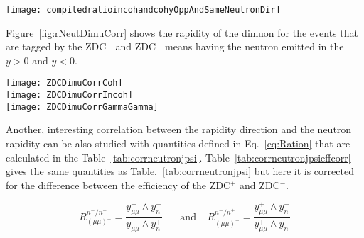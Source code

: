     \begin{figure*}[!Hhtb]
      \begin{center}
        \texttt{[image: compiledratioincohandcohyOppAndSameNeutronDir]}
        \caption{ \label{fig:r4} Rapidity ratios $R_{opp/same}$ for low-\pt 
          ( left) and high-\pt ( right) \JPsi.}
      \end{center}
    \end{figure*}
    
    Figure~\ref{fig:rNeutDimuCorr} shows the rapidity of the dimuon for the 
      events that are tagged by the ZDC$^{+}$ and  ZDC$^{-}$ means having 
      the neutron emitted in the $y>0$ and $y<0$. 
    
    \begin{figure*}[!Hhtb]
      \begin{center}
        \texttt{[image: ZDCDimuCorrCoh]}\\
        \texttt{[image: ZDCDimuCorrIncoh]}\\
        \texttt{[image: ZDCDimuCorrGammaGamma]}
        \caption{ \label{fig:rNeutDimuCorr} Rapidity distribution of \JPsi in the
          case of the events having the neutron in negative and positive rapidity 
          for the low-\pt \JPsi (top), high-\pt \JPsi (middle) and dimuons from
          $\gamma \gamma$ sample (bottom). }
      \end{center}
    \end{figure*}
    
    Another, interesting correlation between the \JPsi rapidity direction and 
      the neutron rapidity can be also studied with quantities defined in 
      Eq.~\ref{eq:Ration} that are calculated in the 
      Table~\ref{tab:corrneutronjpsi}. 
    Table~\ref{tab:corrneutronjpsieffcorr} gives the same quantities as  
      Table.~\ref{tab:corrneutronjpsi} but here it is corrected for the 
      difference between the efficiency of the ZDC$^{+}$ and  ZDC$^{-}$. 
    
    \begin{equation}
      \label{eq:Ration}
      R_{(\mu\mu)^{-}}^{n^{-}/n^{+}} =  \frac{y^{-}_{\mu\mu} \wedge 
        y_{n}^{-}}{y^{-}_{\mu\mu} \wedge y_{n}^{+} }~~~~~~~~\mbox{and}~~~~~
        R_{(\mu\mu)^{+}}^{n^{-}/n^{+}} =  \frac{y^{+}_{\mu\mu} \wedge 
        y_{n}^{-}}{y^{+}_{\mu\mu} \wedge y_{n}^{+} }
    \end{equation}
    
